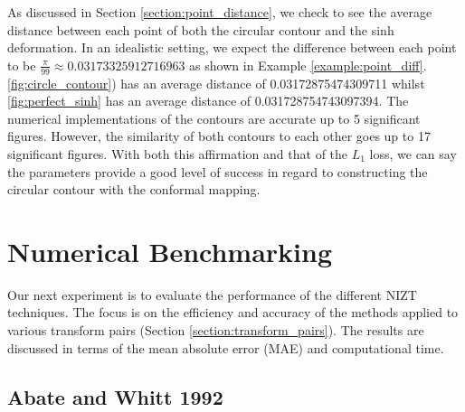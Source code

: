 \documentclass[a4paper]{report}
\begin{document}
As discussed in Section \ref{section:point_distance}, we check to see the average distance between each point of both the circular contour and the sinh deformation. In an idealistic setting, we expect the difference between each point to be $\frac{\pi}{99} \approx 0.03173325912716963$ as shown in Example \ref{example:point_diff}. \autoref{fig:circle_contour}) has an average distance of 0.03172875474309711  whilst \autoref{fig:perfect_sinh} has an average distance of 0.031728754743097394. The numerical implementations of the contours are accurate up to 5 significant figures. However, the similarity of both contours to each other goes up to 17 significant figures. With both this affirmation and that of the $L_1$ loss, we can say the parameters provide a good level of success in regard to constructing the circular contour with the conformal mapping.

\section{Numerical Benchmarking}
Our next experiment is to evaluate the performance of the different NIZT techniques. The focus is on the efficiency and accuracy of the methods applied to various transform pairs (Section \ref{section:transform_pairs}). The results are discussed in terms of the mean absolute error (MAE) and computational time.

\subsection{Abate and Whitt 1992}
\end{document}
